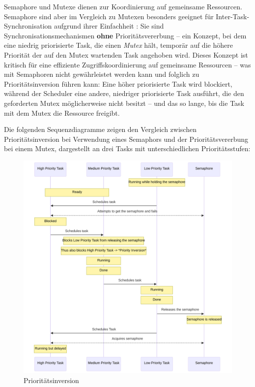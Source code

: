 Semaphore und Mutexe dienen zur Koordinierung auf gemeinsame Ressourcen.
Semaphore sind aber im Vergleich zu Mutexen besonders geeignet für
Inter-Task-Synchronisation aufgrund ihrer Einfachheit
\cite{freertos_semphr_doc}: Sie sind Synchronisationsmechanismen \textbf{ohne}
Prioritätsvererbung -- ein Konzept, bei dem eine niedrig priorisierte Task, die
einen \textit{Mutex} hält, temporär auf die höhere Priorität der auf den Mutex
wartenden Task angehoben wird. Dieses Konzept ist kritisch für eine effiziente
Zugriffskoordinierung auf gemeinsame Ressourcen -- was mit Semaphoren nicht
gewährleistet werden kann und folglich zu Prioritätsinversion führen kann: Eine
höher priorisierte Task wird blockiert, während der Scheduler eine andere,
niedriger priorisierte Task ausführt, die den geforderten Mutex möglicherweise
nicht besitzt -- und das so lange, bis die Task mit dem Mutex die Ressource
freigibt.

Die folgenden Sequenzdiagramme zeigen den Vergleich zwischen Prioritätsinversion
bei Verwendung eines Semaphors und der Prioritätsvererbung bei einem Mutex,
dargestellt an drei Tasks mit unterschiedlichen Prioritätsstufen:

\begin{figure}[H]
    \centering
    \includegraphics[width=1\textwidth]{assets/prio_inversion}
    \caption{Prioritätsinversion}
\end{figure}

